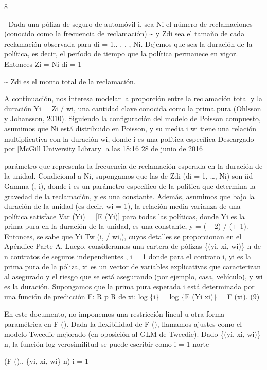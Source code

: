 \documentclass[]{article}
\begin{document}
8

 Dada una póliza de seguro de automóvil i, sea Ni el número de
reclamaciones (conocido como la frecuencia de reclamación)
\textasciitilde{} y Zdi sea el tamaño de cada reclamación observada para
di = 1,. . . , Ni. Dejemos que sea la duración de la política, es decir,
el período de tiempo que la política permanece en vigor. Entonces Zi =
Ni di = 1

\textasciitilde{} Zdi es el monto total de la reclamación.

A continuación, nos interesa modelar la proporción entre la reclamación
total y la duración Yi = Zi / wi, una cantidad clave conocida como la
prima pura (Ohlsson y Johansson, 2010). Siguiendo la configuración del
modelo de Poisson compuesto, asumimos que Ni está distribuido en
Poisson, y su media i wi tiene una relación multiplicativa con la
duración wi, donde i es una política específica Descargado por {[}McGill
University Library{]} a las 18:16 28 de junio de 2016

parámetro que representa la frecuencia de reclamación esperada en la
duración de la unidad. Condicional a Ni, supongamos que las de Zdi (di =
1, \ldots{}, Ni) son iid Gamma (, i), donde i es un parámetro específico
de la política que determina la gravedad de la reclamación, y es una
constante. Además, asumimos que bajo la duración de la unidad (es decir,
wi = 1), la relación media-varianza de una política satisface Var (Yi) =
{[}E (Yi){]} para todas las políticas, donde Yi es la prima pura en la
duración de la unidad, es una constante, y = (+ 2) / (+ 1). Entonces, se
sabe que Yi Tw (i, / wi,), cuyos detalles se proporcionan en el Apéndice
Parte A. Luego, consideramos una cartera de pólizas \{(yi, xi, wi)\} n
de n contratos de seguros independientes , i = 1 donde para el contrato
i, yi es la prima pura de la póliza, xi es un vector de variables
explicativas que caracterizan al asegurado y el riesgo que se está
asegurando (por ejemplo, casa, vehículo), y wi es la duración.
Supongamos que la prima pura esperada i está determinada por una función
de predicción F: R p R de xi: log \{i\} = log \{E (Yi \textbar{} xi)\} =
F (xi). (9)

En este documento, no imponemos una restricción lineal u otra forma
paramétrica en F (). Dada la flexibilidad de F (), llamamos ajustes como
el modelo Tweedie mejorado (en oposición al GLM de Tweedie). Dado \{(yi,
xi, wi)\} n, la función log-verosimilitud se puede escribir como i = 1
norte

(F (),, \textbar{} \{yi, xi, wi\} n) i = 1
\end{document}
